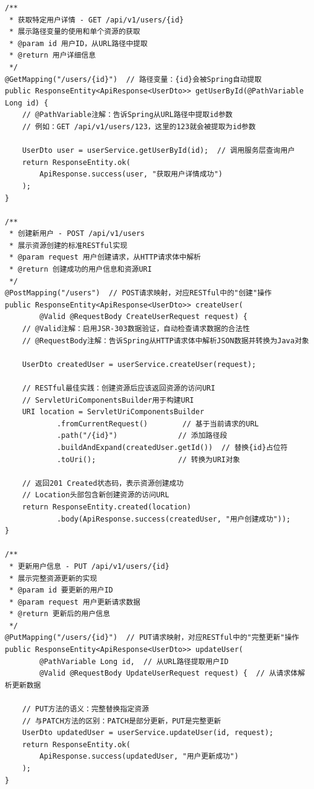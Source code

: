 \begin{verbatim}
/**
 * 获取特定用户详情 - GET /api/v1/users/{id}
 * 展示路径变量的使用和单个资源的获取
 * @param id 用户ID，从URL路径中提取
 * @return 用户详细信息
 */
@GetMapping("/users/{id}")  // 路径变量：{id}会被Spring自动提取
public ResponseEntity<ApiResponse<UserDto>> getUserById(@PathVariable Long id) {
    // @PathVariable注解：告诉Spring从URL路径中提取id参数
    // 例如：GET /api/v1/users/123，这里的123就会被提取为id参数
    
    UserDto user = userService.getUserById(id);  // 调用服务层查询用户
    return ResponseEntity.ok(
        ApiResponse.success(user, "获取用户详情成功")
    );
}

/**
 * 创建新用户 - POST /api/v1/users
 * 展示资源创建的标准RESTful实现
 * @param request 用户创建请求，从HTTP请求体中解析
 * @return 创建成功的用户信息和资源URI
 */
@PostMapping("/users")  // POST请求映射，对应RESTful中的"创建"操作
public ResponseEntity<ApiResponse<UserDto>> createUser(
        @Valid @RequestBody CreateUserRequest request) {
    // @Valid注解：启用JSR-303数据验证，自动检查请求数据的合法性
    // @RequestBody注解：告诉Spring从HTTP请求体中解析JSON数据并转换为Java对象
    
    UserDto createdUser = userService.createUser(request);
    
    // RESTful最佳实践：创建资源后应该返回资源的访问URI
    // ServletUriComponentsBuilder用于构建URI
    URI location = ServletUriComponentsBuilder
            .fromCurrentRequest()        // 基于当前请求的URL
            .path("/{id}")              // 添加路径段
            .buildAndExpand(createdUser.getId())  // 替换{id}占位符
            .toUri();                   // 转换为URI对象
            
    // 返回201 Created状态码，表示资源创建成功
    // Location头部包含新创建资源的访问URL
    return ResponseEntity.created(location)
            .body(ApiResponse.success(createdUser, "用户创建成功"));
}

/**
 * 更新用户信息 - PUT /api/v1/users/{id}
 * 展示完整资源更新的实现
 * @param id 要更新的用户ID
 * @param request 用户更新请求数据
 * @return 更新后的用户信息
 */
@PutMapping("/users/{id}")  // PUT请求映射，对应RESTful中的"完整更新"操作
public ResponseEntity<ApiResponse<UserDto>> updateUser(
        @PathVariable Long id,  // 从URL路径提取用户ID
        @Valid @RequestBody UpdateUserRequest request) {  // 从请求体解析更新数据
    
    // PUT方法的语义：完整替换指定资源
    // 与PATCH方法的区别：PATCH是部分更新，PUT是完整更新
    UserDto updatedUser = userService.updateUser(id, request);
    return ResponseEntity.ok(
        ApiResponse.success(updatedUser, "用户更新成功")
    );
}


\end{verbatim}
